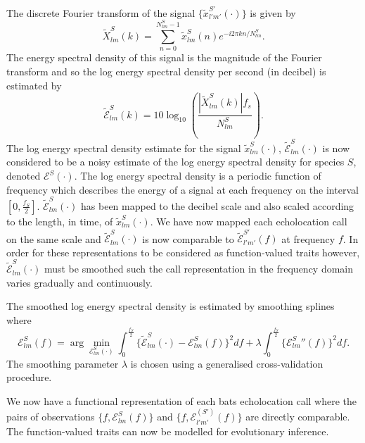 \documentclass[wsdraft]{ws-rv9x6} %
\begin{document}
The discrete Fourier transform of the signal \(\{\tilde{x}_{l'm'}^{S'}(\cdot)\}\) is given by\[\tilde{X}_{lm}^S(k) = \sum_{n = 0}^{N_{lm}^S - 1} \tilde{x}_{lm}^{S}(n) e^{-i2\pi kn / N_{lm}^S }.\] 
The energy spectral density of this signal is the magnitude of the Fourier transform and so the log energy spectral density per second (in decibel) is estimated by \[\tilde{\mathcal{E}}_{lm}^S(k) = 10 \log_{10} \left( \frac{|\tilde{X}_{lm}^S(k)|f_s}{N_{lm}^S}\right).\]
The log energy spectral density estimate for the signal \(\tilde{x}_{lm}^S(\cdot)\), \(\tilde{\mathcal{E}}_{lm}^S(\cdot)\) is now considered to be a noisy estimate of the log energy spectral density for species \(S\), denoted \(\mathcal{E}^S(\cdot)\). The log energy spectral density is a periodic function of frequency which describes the energy of a signal at each frequency on the interval \([0, \frac{f_S}{2}]\). \(\tilde{\mathcal{E}}_{lm}^S(\cdot)\) has been mapped to the decibel scale and also scaled according to the length, in time, of \(\tilde{x}_{lm}^S(\cdot)\).\cite{antoniou2006digital} We have now mapped each echolocation call on the same scale and \(\tilde{\mathcal{E}}_{lm}^S(\cdot)\) is now comparable to \(\tilde{\mathcal{E}}_{l'm'}^{S'}(f)\) at frequency \(f\). In order for these representations to be considered as function-valued traits however, \(\tilde{\mathcal{E}}_{lm}^S(\cdot)\) must be smoothed such the call representation in the frequency domain varies gradually and continuously.

The smoothed log energy spectral density is estimated by smoothing splines where \[
\mathcal{E}_{lm}^S(f) = \arg \min_{\mathcal{E}_{lm}^S(\cdot)} \int_{0}^{\frac{f_S}{2}}  \{ \tilde{\mathcal{E}}_{lm}^S(\cdot) - \mathcal{E}_{lm}^S(f) \}^2 df + \lambda \int_{0}^{\frac{f_S}{2}} \{ {\mathcal{E}_{lm}^{S}}'' (f)\}^2 df.
\]
The smoothing parameter \(\lambda\) is chosen using a generalised cross-validation procedure.\cite{friedman2001elements} \cite{citeR}

We now have a functional representation of each bats echolocation call where the pairs of observations \(\{f, \mathcal{E}_{lm}^S(f)\}\) and \(\{f, \mathcal{E}_{l'm'}^(S')(f)\}\) are directly comparable. The function-valued traits can now be modelled for evolutionary inference.
 




\end{document}

